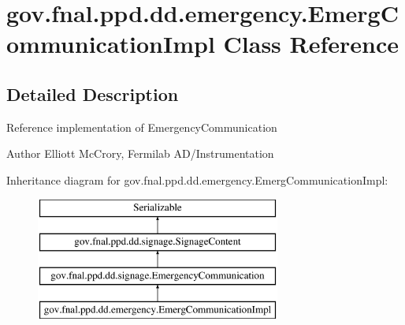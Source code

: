 \hypertarget{classgov_1_1fnal_1_1ppd_1_1dd_1_1emergency_1_1EmergCommunicationImpl}{\section{gov.\-fnal.\-ppd.\-dd.\-emergency.\-Emerg\-Communication\-Impl Class Reference}
\label{classgov_1_1fnal_1_1ppd_1_1dd_1_1emergency_1_1EmergCommunicationImpl}
}


\subsection{Detailed Description}
Reference implementation of Emergency\-Communication

\begin{DoxyAuthor}{Author}
Elliott Mc\-Crory, Fermilab A\-D/\-Instrumentation 
\end{DoxyAuthor}
Inheritance diagram for gov.\-fnal.\-ppd.\-dd.\-emergency.\-Emerg\-Communication\-Impl\-:\begin{figure}[H]
\begin{center}
\leavevmode
\includegraphics[height=4.000000cm]{classgov_1_1fnal_1_1ppd_1_1dd_1_1emergency_1_1EmergCommunicationImpl}
\end{center}
\end{figure}
